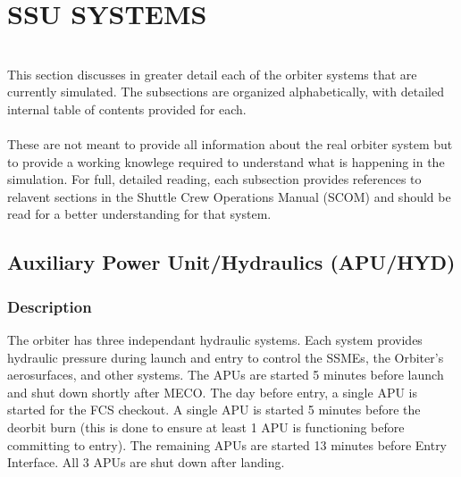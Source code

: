 \documentclass[Space_Shuttle_Ultra_Manual.tex]{subfiles}
\begin{document}
\section{SSU SYSTEMS}
\begin{multicols*}{2}
\renewcommand{\cfttoctitlefont}{\bf}
\localtableofcontents
\noindent
\\
This section discusses in greater detail each of the orbiter systems that are currently simulated. The subsections are organized alphabetically, with detailed internal table of contents provided for each.\\
\\
These are not meant to provide all information about the real orbiter system but to provide a working knowlege required to understand what is happening in the simulation. For full, detailed reading, each subsection provides references to relavent sections in the Shuttle Crew Operations Manual (SCOM) and should be read for a better understanding for that system.
\end{multicols*}

\subsection{Auxiliary Power Unit/Hydraulics (APU/HYD)}
\begin{multicols*}{2}
\renewcommand{\cfttoctitlefont}{\bf}
\localtableofcontents
\subsubsection{Description}
The orbiter has three independant hydraulic systems. Each system provides hydraulic pressure during launch and entry to control the SSMEs, the Orbiter's aerosurfaces, and other systems.
The APUs are started 5 minutes before launch and shut down shortly after MECO.
The day before entry, a single APU is started for the FCS checkout.
A single APU is started 5 minutes before the deorbit burn (this is done to ensure at least 1 APU is functioning before committing to entry). The remaining APUs are started 13 minutes before Entry Interface.
All 3 APUs are shut down after landing.
\end{multicols*}
\end{document}
